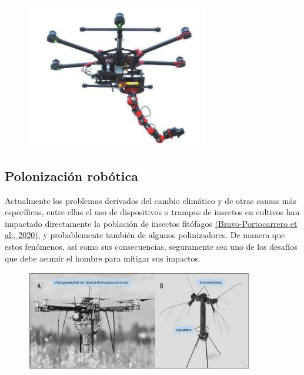 \documentclass{article}
\begin{document}
\begin{figure}[h]
\includegraphics[width=8cm]{pictures/arm_drone.png}
\centering
\end{figure}



\newpage
\subsection{Polonización robótica}


Actualmente los problemas derivados del cambio climático y de otras causas más específicas, entre ellas el uso de dispositivos o trampas de insectos en cultivos han impactado directamente la población de insectos fitófagos \href{http://www.scielo.org.pe/scielo.php?pid=S2077-99172020000100061&script=sci_abstract}{(Bravo-Portocarrero et al., 2020)}, y probablemente también de algunos polinizadores. De manera que estos fenómenos, así como sus consecuencias, seguramente sea uno de los desafíos que debe asumir el hombre para mitigar sus impactos.\\

\begin{figure}[h]
\includegraphics[width=10cm]{pictures/polinizadores.jpg}
\centering
\end{figure}
\end{document}
